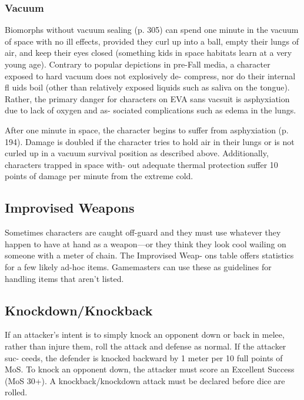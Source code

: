 \subsubsection{Vacuum}


Biomorphs without vacuum sealing (p. 305) can 
spend one minute in the vacuum of space with no ill 
effects, provided they curl up into a ball, empty their 
lungs of air, and keep their eyes closed (something kids 
in space habitats learn at a very young age). Contrary 
to popular depictions in pre-Fall media, a character 
exposed to hard vacuum does not explosively de-
compress, nor do their internal fl uids boil (other than 
relatively exposed liquids such as saliva on the tongue). 
Rather, the primary danger for characters on EVA sans 
vacsuit is asphyxiation due to lack of oxygen and as-
sociated complications such as edema in the lungs.

After one minute in space, the character begins to 
suffer from asphyxiation (p. 194). Damage is doubled 
if the character tries to hold air in their lungs or is not 
curled up in a vacuum survival position as described 
above. Additionally, characters trapped in space with-
out adequate thermal protection suffer 10 points of 
damage per minute from the extreme cold.

\subsection{Improvised Weapons}

Sometimes characters are caught off-guard and they 
must use whatever they happen to have at hand as 
a weapon—or they think they look cool wailing on 
someone with a meter of chain. The Improvised Weap-
ons table offers statistics for a few likely ad-hoc items. 
Gamemasters can use these as guidelines for handling 
items that aren't listed.

\subsection{Knockdown/Knockback}

If an attacker's intent is to simply knock an opponent 
down or back in melee, rather than injure them, roll 
the attack and defense as normal. If the attacker suc-
ceeds, the defender is knocked backward by 1 meter 
per 10 full points of MoS. To knock an opponent 
down, the attacker must score an Excellent Success 
(MoS 30+). A knockback/knockdown attack must be 
declared before dice are rolled.

